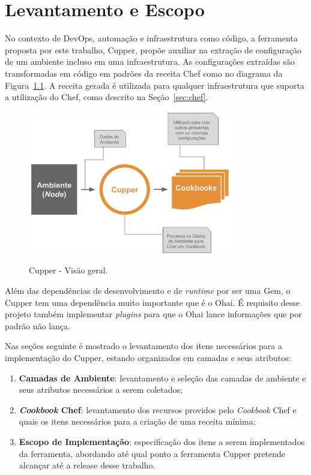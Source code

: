\newpage\null\thispagestyle{empty}\newpage
\chapter{Levantamento e Escopo}
\label{chap:lev_es}

No contexto de DevOps, automação e infraestrutura como código, a ferramenta
proposta por este trabalho, Cupper, propõe auxiliar na extração de configuração
de um ambiente incluso em uma infraestrutura. As configurações extraídas são
transformadas em código em padrões da receita Chef como 
no diagrama da Figura~\ref{fig:cupper_geral}. A
receita gerada é utilizada para qualquer infraestrutura que suporta a
utilização do Chef, como descrito na Seção~\ref{sec:chef}.

\begin{figure}[H]
  \centering
  \includegraphics[width=0.8\textwidth]{figuras/cupper_geral.eps}
  \label{fig:cupper_geral}
  \caption{Cupper - Visão geral.}
\end{figure}

Além das dependências de desenvolvimento e de \textit{runtime} por ser uma Gem,
o Cupper tem uma dependência muito
importante que é o Ohai. É requisito desse projeto também implementar
\textit{plugins} para que o Ohai lance informações que por padrão 
não lança.

Nas seções seguinte é mostrado o levantamento dos itens necessários para
a implementação do Cupper, estando organizados em camadas e seus atributos:

\begin{enumerate}
  \item \textbf{Camadas de Ambiente}: levantamento e seleção das camadas de ambiente
    e seus atributos necessários a serem coletados;
  \item \textbf{\textit{Cookbook} Chef}: levantamento dos recursos providos pelo \textit{Cookbook} Chef e quais os
    itens necessários para a criação de uma receita mínima;
  \item \textbf{Escopo de Implementação}: especificação dos itens a serem implementados
    da ferramenta, abordando até qual ponto a ferramenta Cupper pretende alcançar
    até a release desse trabalho.
\end{enumerate}






